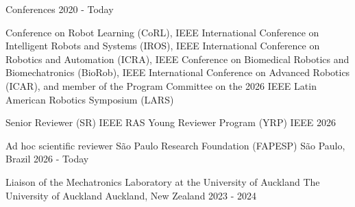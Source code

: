 \begin{cventries}
  \cventry
    {Conferences} %
    {} %
    {} %
    {2020 - Today} %
    { \begin{cvitems} %
        \item {Conference on Robot Learning (CoRL), IEEE International Conference on Intelligent Robots and Systems (IROS), IEEE International Conference on Robotics and Automation (ICRA), IEEE Conference on Biomedical Robotics and Biomechatronics (BioRob), IEEE International Conference on Advanced Robotics (ICAR), and member of the Program Committee on the 2026 IEEE Latin American Robotics Symposium (LARS)}
      \end{cvitems}}
\vspace{-5pt} 




\cventry
  {Senior Reviewer (SR)}
  {IEEE RAS Young Reviewer Program (YRP)}
  {IEEE}
  {2026}
  {}
\vspace{-15pt}


\cventry
  {Ad hoc scientific reviewer}
  {São Paulo Research Foundation (FAPESP)}
  {São Paulo, Brazil}
  {2026 - Today}
  {}
\vspace{-15pt}


  \cventry
    {Liaison of the Mechatronics Laboratory at the University of Auckland} %
    {The University of Auckland} %
    {Auckland, New Zealand} %
    {2023 - 2024} %
    {}
\vspace{-15pt} 



\end{cventries}
